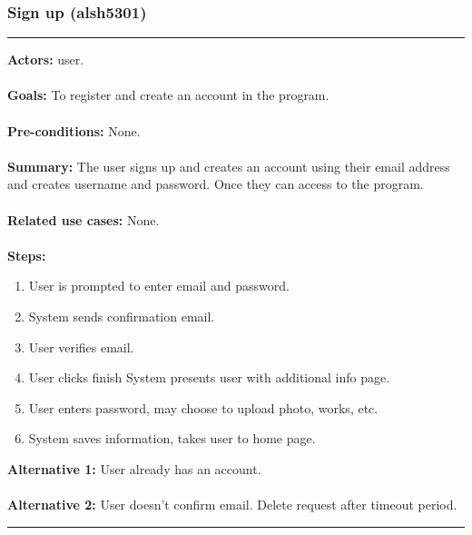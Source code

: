 \documentclass[11pt]{report}
\begin{document}
\subsubsection{Sign up (alsh5301)}
\vspace{2pt}
\hrule
\vspace{8pt}
 \textbf{Actors:} user. \\ \\
\textbf{Goals:} To register and create an account in the program. \\ \\
 \textbf{Pre-conditions:} None. \\ \\
 \textbf{Summary:} The user signs up and creates an account using their email address and creates username and password. Once they can access to the program. \\ \\
\textbf{Related use cases:} None. \\ \\
\textbf{Steps:} \begin{enumerate}
  \item User is prompted to enter email and password. 
  \item System sends confirmation email. 
  \item User verifies email. 
  \item User clicks finish System presents user with additional info page. 
  \item User enters password, may choose to upload photo, works, etc. 
  \item System saves information, takes user to home page. 
 \end{enumerate} 
 \textbf{Alternative 1:} User already has an account. \\ \\
\textbf{Alternative 2:} User doesn't confirm email. Delete request after timeout period. \\
\vspace{8pt}
\hrule
\newpage
\end{document}
